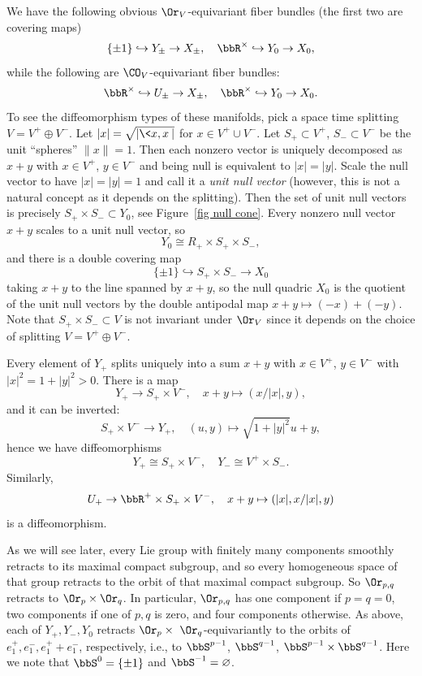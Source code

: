 We have the following obvious $\Or_V$-equivariant fiber bundles (the first two are covering maps)
\[\{\pm 1\}\hookrightarrow Y_\pm\to X_\pm,\quad \bbR^\times\hookrightarrow Y_0\to X_0,\]
while the following are $\CO_V$-equivariant fiber bundles:
\[\bbR^\times\hookrightarrow U_\pm\to X_\pm,\quad \bbR^\times\hookrightarrow Y_0\to X_0.\]
To see the diffeomorphism types of these manifolds, pick a space time splitting $V=V^+\oplus V^-$. Let $|x|=\sqrt{|\<x,x\>|}$ for $x\in V^+\cup V^-$. Let $S_+\subset V^+$, $S_-\subset V^-$ be the unit ``spheres'' $\lVert x\rVert =1$. Then each nonzero vector is uniquely decomposed as $x+y$ with $x\in V^+$, $y\in V^-$ and being null is equivalent to $|x|=|y|$. Scale the null vector to have $|x|=|y|=1$ and call it a \emph{unit null vector} (however, this is not a natural concept as it depends on the splitting). Then the set of unit null vectors is precisely $S_+\times S_-\subset Y_0$, see Figure~\ref{fig null cone}. Every nonzero null vector $x+y$ scales to a unit null vector, so 
\[Y_0\cong R_+\times S_+\times S_-,\]
and there is a double covering map 
\[\{\pm 1\}\hookrightarrow S_+\times S_-\to X_0\]
taking $x+y$ to the line spanned by $x+y$, so the null quadric $X_0$ is the quotient of the unit null vectors by the double antipodal map $x+y\mapsto (-x)+(-y)$. Note that $S_+\times S_-\subset V$ is not invariant under $\Or_V$ since it depends on the choice of splitting $V=V^+\oplus V^-$.

Every element of $Y_+$ splits uniquely into a sum $x+y$ with $x\in V^+$, $y\in V^-$ with $|x|^2=1+|y|^2>0$. There is a map 
\[Y_+\to S_+\times V^-,\quad x+y\mapsto (x/|x|,y),\]
and it can be inverted:
\[S_+\times V^-\to Y_+,\quad  (u,y)\mapsto \sqrt{1+|y|^2}u+y,\]
hence we have diffeomorphisms
\[Y_+\cong S_+\times V^-,\quad Y_-\cong V^+\times S_-.\]
Similarly, 
\[U_+\to \bbR^+\times S_+\times V^-,\quad x+y\mapsto (|x|,x/|x|,y)\]
is a diffeomorphism. 

As we will see later, every Lie group with finitely many components smoothly retracts to its maximal compact subgroup, and so every homogeneous space of that group retracts to the orbit of that maximal compact subgroup. So $\Or_{p,q}$ retracts to $\Or_p\times\Or_q$. In particular, $\Or_{p,q}$ has one component if $p=q=0$, two components if one of $p,q$ is zero, and four components otherwise.  As above, each of $Y_+,Y_-,Y_0$ retracts  $\Or_p\times\ \Or_q$-equivariantly to the orbits of $e_1^+,e_1^-,e_1^++e_1^-$, respectively, i.e., to $\bbS^{p-1}$, $\bbS^{q-1}$, $\bbS^{p-1}\times\bbS^{q-1}$. Here we note that $\bbS^{0}=\{\pm 1\}$ and $\bbS^{-1}=\varnothing$.

